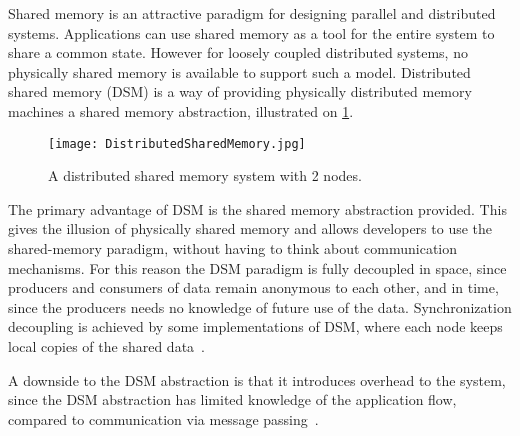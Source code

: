 Shared memory is an attractive paradigm for designing parallel and distributed systems. Applications can use shared memory as a tool for the entire system to share a common state. However for loosely coupled distributed systems, no physically shared memory is available to support such a model. Distributed shared memory (DSM) is a way of providing physically distributed memory machines a shared memory abstraction, illustrated on \cref{fig:distributedSharedMemory}.

\begin{figure}
	\centering
	\texttt{[image: DistributedSharedMemory.jpg]} 
	\caption[Distributed Computing System with 2 nodes]{
		\label{fig:distributedSharedMemory} 
		\footnotesize{%
			A distributed shared memory system with 2 nodes.
		}
	}
\end{figure}

The primary advantage of DSM is the shared memory abstraction provided. This gives the illusion of physically shared memory and allows developers to use the shared-memory paradigm, without having to think about communication mechanisms. For this reason the DSM paradigm is fully decoupled in space, since producers and consumers of data remain anonymous to each other, and in time, since the producers needs no knowledge of future use of the data. Synchronization decoupling is achieved by some implementations of DSM, where each node keeps local copies of the shared data~\cite{guedes1993distributed}.

A downside to the DSM abstraction is that it introduces overhead to the system, since the DSM abstraction has limited knowledge of the application flow, compared to communication via message passing~\cite{lu1995message}. 

 




